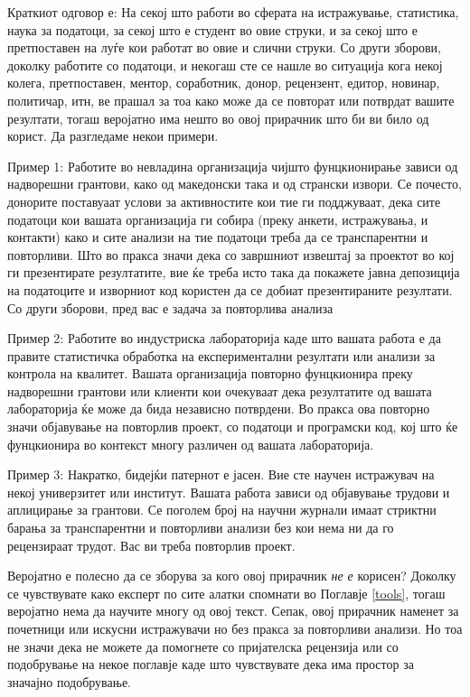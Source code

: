 \documentclass[
]{book}
\begin{document}
Краткиот одговор е: На секој што работи во сферата на истражување, статистика, наука за податоци, за секој што е студент во овие струки, и за секој што е претпоставен на луѓе кои работат во овие и слични струки. Со други зборови, доколку работите со податоци, и некогаш сте се нашле во ситуација кога некој колега, претпоставен, ментор, соработник, донор, рецензент, едитор, новинар, политичар, итн, ве прашал за тоа како може да се повторат или потврдат вашите резултати, тогаш веројатно има нешто во овој прирачник што би ви било од корист. Да разгледаме некои примери.

Пример 1: Работите во невладина организација чијшто фунцкионирање зависи од надворешни грантови, како од македонски така и од странски извори. Се почесто, донорите поставуаат услови за активностите кои тие ги подджуваат, дека сите податоци кои вашата организација ги собира (преку анкети, истражувања, и контакти) како и сите анализи на тие податоци треба да се транспарентни и повторливи. Што во пракса значи дека со завршниот извештај за проектот во кој ги презентирате резултатите, вие ќе треба исто така да покажете јавна депозиција на податоците и изворниот код користен да се добиат презентираните резултати. Со други зборови, пред вас е задача за повторлива анализа

Пример 2: Работите во индустриска лабораторија каде што вашата работа е да правите статистичка обработка на експериментални резултати или анализи за контрола на квалитет. Вашата организација повторно фунцкионира преку надворешни грантови или клиенти кои очекуваат дека резултатите од вашата лабораторија ќе може да бида независно потврдени. Во пракса ова повторно значи објавување на повторлив проект, со податоци и програмски код, кој што ќе фунцкионира во контекст многу различен од вашата лабораторија.

Пример 3: Накратко, бидејќи патернот е јасен. Вие сте научен истражувач на некој универзитет или институт. Вашата работа зависи од објавување трудови и аплицирање за грантови. Се поголем број на научни журнали имаат стриктни барања за транспарентни и повторливи анализи без кои нема ни да го рецензираат трудот. Вас ви треба повторлив проект.

Веројатно е полесно да се зборува за кого овој прирачник \emph{не е} корисен? Доколку се чувствувате како експерт по сите алатки спомнати во Поглавје \ref{tools}, тогаш веројатно нема да научите многу од овој текст. Сепак, овој прирачник наменет за почетници или искусни истражувачи но без пракса за повторливи анализи. Но тоа не значи дека не можете да помогнете со пријателска рецензија или со подобрување на некое поглавје каде што чувствувате дека има простор за значајно подобрување.
\end{document}
